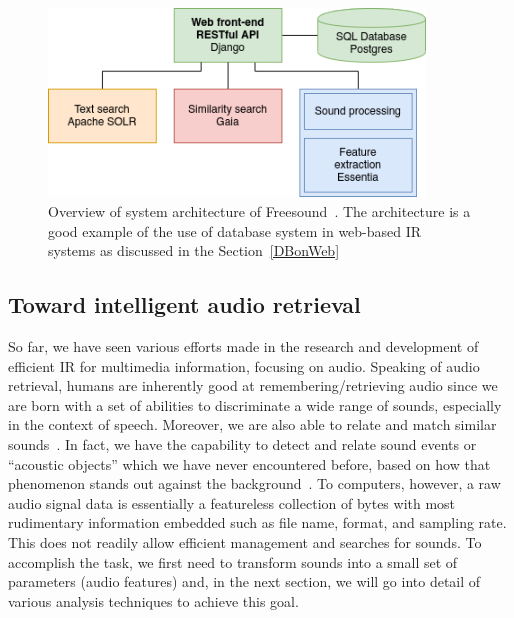 
\begin{figure}[htb]
	\centering
	\includegraphics[width=10cm]{Figures/freesound_api.png}
	\caption{Overview of system architecture of Freesound~\cite{frederic2013}. The architecture is a good example of the use of database system in web-based IR systems as discussed in the Section~\ref{DBonWeb}}
	\label{freesound-api}
\end{figure}




\subsection{Toward intelligent audio retrieval}
So far, we have seen various efforts made in the research and development of efficient IR for multimedia information, focusing on audio. Speaking of audio retrieval, humans are inherently good at remembering/retrieving audio since we are born with a set of abilities to discriminate a wide range of sounds, especially in the context of speech. Moreover, we are also able to relate and match similar sounds~\cite{denise1995}. In fact, we have the capability to detect and relate sound events or “acoustic objects” which we have never encountered before, based on how that phenomenon stands out against the background~\cite{kumar2014}. To computers, however, a raw audio signal data is essentially a featureless collection of bytes with most rudimentary information embedded such as file name, format, and sampling rate. This does not readily allow efficient management and searches for sounds. To accomplish the task, we first need to transform sounds into a small set of parameters (audio features) and, in the next section, we will go into detail of various analysis techniques to achieve this goal. 

